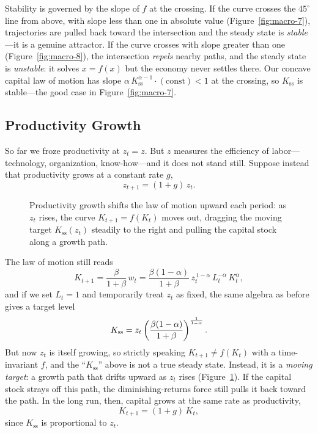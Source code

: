 Stability is governed by the slope of $f$ at the crossing. If the curve crosses the $45^\circ$ line from above, with slope less than one in absolute value (Figure~\ref{fig:macro-7}), trajectories are pulled back toward the intersection and the steady state is \emph{stable}---it is a genuine attractor. If the curve crosses with slope greater than one (Figure~\ref{fig:macro-8}), the intersection \emph{repels} nearby paths, and the steady state is \emph{unstable}: it solves $x = f(x)$ but the economy never settles there. Our concave capital law of motion has slope $\alpha\, K_{\mathrm{ss}}^{\alpha-1}\cdot(\text{const}) < 1$ at the crossing, so $K_{\mathrm{ss}}$ is stable---the good case in Figure~\ref{fig:macro-7}.

\subsection{Productivity Growth}

So far we froze productivity at $z_t = z$. But $z$ measures the efficiency of labor---technology, organization, know-how---and it does not stand still. Suppose instead that productivity grows at a constant rate $g$,
\[
z_{t+1} = (1+g)\, z_t.
\]

\begin{figure}[h]
\centering

\caption{Productivity growth shifts the law of motion upward each period: as $z_t$ rises, the curve $K_{t+1}=f(K_t)$ moves out, dragging the moving target $K_{\mathrm{ss}}(z_t)$ steadily to the right and pulling the capital stock along a growth path.}
\label{fig:macro-9}
\end{figure}

The law of motion still reads
\[
K_{t+1} = \frac{\beta}{1+\beta}\, w_t = \frac{\beta(1-\alpha)}{1+\beta}\, z_t^{\,1-\alpha}\, L_t^{-\alpha}\, K_t^{\alpha},
\]
and if we set $L_t = 1$ and temporarily treat $z_t$ as fixed, the same algebra as before gives a target level
\[
K_{\mathrm{ss}} = z_t\left(\frac{\beta(1-\alpha)}{1+\beta}\right)^{\frac{1}{1-\alpha}}.
\]
But now $z_t$ is itself growing, so strictly speaking $K_{t+1} \ne f(K_t)$ with a time-invariant $f$, and the ``$K_{\mathrm{ss}}$'' above is not a true steady state. Instead, it is a \emph{moving target}: a growth path that drifts upward as $z_t$ rises (Figure~\ref{fig:macro-9}). If the capital stock strays off this path, the diminishing-returns force still pulls it back toward the path. In the long run, then, capital grows at the same rate as productivity,
\[
K_{t+1} = (1+g)\, K_t,
\]
since $K_{\mathrm{ss}}$ is proportional to $z_t$.


